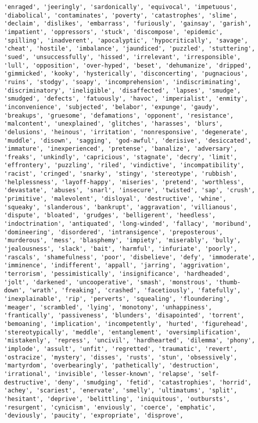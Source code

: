 \documentclass[11pt]{article}
\begin{document}
\begin{Verbatim}[commandchars=\\\{\}]
'enraged', 'jeeringly', 'sardonically', 'equivocal', 'impetuous', 'diabolical', 'contaminates', 'poverty', 'catastrophes', 'slime', 'declaim', 'dislikes', 'embarrass', 'furiously', 'gainsay', 'garish', 'impatient', 'oppressors', 'stuck', 'discompose', 'epidemic', 'spilling', 'inadverent', 'apocalyptic', 'hypocritically', 'savage', 'cheat', 'hostile', 'imbalance', 'jaundiced', 'puzzled', 'stuttering', 'sued', 'unsuccessfully', 'hissed', 'irrelevant', 'irresponsible', 'lull', 'opposition', 'over-hyped', 'beset', 'dehumanize', 'dripped', 'gimmicked', 'kooky', 'hysterically', 'disconcerting', 'pugnacious', 'ruins', 'stodgy', 'soapy', 'incomprehension', 'indiscriminating', 'discriminatory', 'ineligible', 'disaffected', 'lapses', 'smudge', 'smudged', 'defects', 'fatuously', 'havoc', 'imperialist', 'enmity', 'inconvenience', 'subjected', 'belabor', 'expunge', 'gaudy', 'breakups', 'gruesome', 'defamations', 'opponent', 'resistance', 'malcontent', 'unexplained', 'glitches', 'harasses', 'blurs', 'delusions', 'heinous', 'irritation', 'nonresponsive', 'degenerate', 'muddle', 'disown', 'sagging', 'god-awful', 'derisive', 'desiccated', 'immature', 'inexperienced', 'pretense', 'banalize', 'adversary', 'freaks', 'unkindly', 'capricious', 'stagnate', 'decry', 'limit', 'effrontery', 'puzzling', 'riled', 'vindictive', 'incompatibility', 'racist', 'cringed', 'snarky', 'stingy', 'stereotype', 'rubbish', 'helplessness', 'layoff-happy', 'miseries', 'pretend', 'worthless', 'devastate', 'abuses', 'snarl', 'insecure', 'twisted', 'sap', 'crush', 'primitive', 'malevolent', 'disloyal', 'destructive', 'whine', 'squeaky', 'slanderous', 'bankrupt', 'aggravation', 'villianous', 'dispute', 'bloated', 'grudges', 'belligerent', 'heedless', 'indoctrination', 'antiquated', 'long-winded', 'fallacy', 'moribund', 'domineering', 'disordered', 'intransigence', 'preposterous', 'murderous', 'mess', 'blasphemy', 'impiety', 'miserably', 'bully', 'jealousness', 'slack', 'bait', 'harmful', 'infuriate', 'poorly', 'rascals', 'shamefulness', 'poor', 'disbelieve', 'defy', 'immoderate', 'imminence', 'indifferent', 'appall', 'jarring', 'aggrivation', 'terrorism', 'pessimistically', 'insignificance', 'hardheaded', 'jolt', 'darkened', 'uncooperative', 'smash', 'monstrous', 'thumb-down', 'wrath', 'freaking', 'crashed', 'facetiously', 'fatefully', 'inexplainable', 'rip', 'perverts', 'squealing', 'floundering', 'meager', 'scrambled', 'lying', 'monotony', 'unhappiness', 'frantically', 'passiveness', 'blunders', 'disapointed', 'torrent', 'bemoaning', 'implication', 'incompetently', 'hurted', 'figurehead', 'stereotypically', 'meddle', 'entanglement', 'oversimplification', 'mistakenly', 'repress', 'uncivil', 'hardhearted', 'dilemma', 'phony', 'implode', 'assult', 'unfit', 'regretted', 'traumatic', 'revert', 'ostracize', 'mystery', 'disses', 'rusts', 'stun', 'obsessively', 'martyrdom', 'overbearingly', 'pathetically', 'destruction', 'irrational', 'invisible', 'lesser-known', 'relapse', 'self-destructive', 'deny', 'smudging', 'fetid', 'catastrophies', 'horrid', 'achey', 'scariest', 'enervate', 'smelly', 'ultimatums', 'split', 'hesitant', 'deprive', 'belittling', 'iniquitous', 'outbursts', 'resurgent', 'cynicism', 'enviously', 'coerce', 'emphatic', 'deviously', 'paucity', 'expropriate', 'disprove', 
\end{Verbatim}
\end{document}

